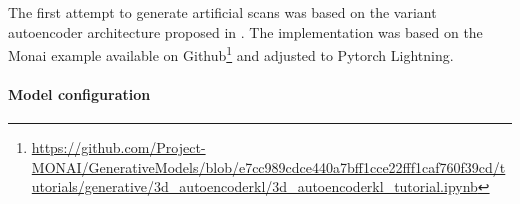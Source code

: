 The first attempt to generate artificial scans was based on the variant autoencoder architecture proposed in \cite{rombach2022high}. The implementation was based on the Monai\cite{Cardoso_MONAI_An_open-source_2022} example available on Github\footnote{\url{https://github.com/Project-MONAI/GenerativeModels/blob/e7cc989cdce440a7bff1cce22fff1caf760f39cd/tutorials/generative/3d_autoencoderkl/3d_autoencoderkl_tutorial.ipynb}} and adjusted to Pytorch Lightning.
\paragraph{Model configuration}








